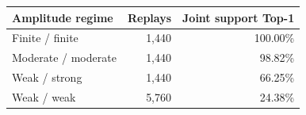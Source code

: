 \begin{tabular}{@{}lrr@{}}\toprule
Amplitude regime & Replays & Joint support Top-1 \\\midrule
Finite / finite & 1,440 & 100.00\% \\
Moderate / moderate & 1,440 & 98.82\% \\
Weak / strong & 1,440 & 66.25\% \\
Weak / weak & 5,760 & 24.38\% \\
\bottomrule\end{tabular}
